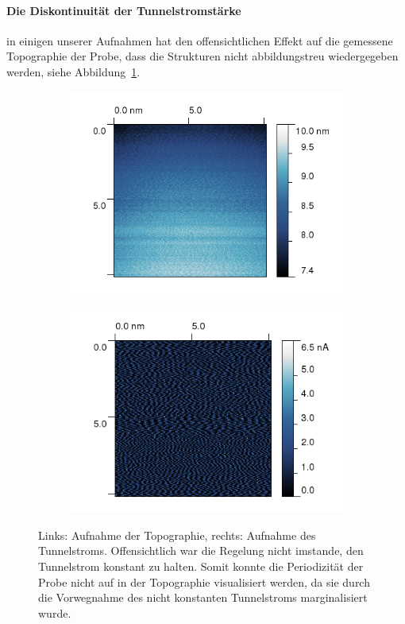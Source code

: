 \paragraph{Die Diskontinuität der Tunnelstromstärke} in einigen unserer Aufnahmen hat den
offensichtlichen Effekt auf die gemessene Topographie der Probe, dass die Strukturen nicht
abbildungstreu wiedergegeben werden, siehe Abbildung~\ref{fig:fehler1}. 

\begin{figure}[h]
    \begin{subfigure}[b]{\picwidth}
    \includegraphics[width=\textwidth]{pics/fehler1a}
    \end{subfigure}\qquad
    \begin{subfigure}[b]{\picwidth}
        \includegraphics[width=\textwidth]{pics/fehler1b}
    \end{subfigure}
    \caption{Links: Aufnahme der Topographie, rechts: Aufnahme des Tunnelstroms.
    Offensichtlich war die Regelung nicht imstande, den Tunnelstrom konstant zu halten. 
    Somit konnte die Periodizität der Probe nicht auf in der Topographie visualisiert werden,
    da sie durch die Vorwegnahme des nicht konstanten Tunnelstroms marginalisiert wurde.}
    \label{fig:fehler1}
\end{figure}

